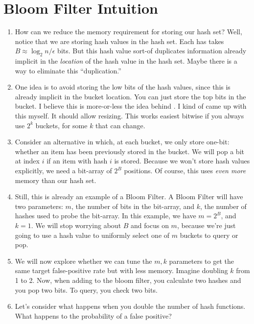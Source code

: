 \documentclass[11pt, oneside]{amsart}
\begin{document}
\section{Bloom Filter Intuition}

\begin{enumerate}

\item How can we reduce the memory requirement for storing our hash set?
Well, notice that we are storing hash values in the hash set. Each has
takes $B \approx \log_2 n / \epsilon$ bits. But this hash value sort-of
duplicates information already implicit in the \emph{location} of the
hash value in the hash set. Maybe there is a way to eliminate this
``duplication.''

\item One idea is to avoid storing the low bits of the hash values,
since this is already implicit in the bucket location. You can just
store the top bits in the bucket. I believe this is more-or-less the
idea behind . I kind of came up with this
myself. It should allow resizing. This works easiest bitwise if you
always use $2^k$ buckets, for some $k$ that can change.

\item Consider an alternative in which, at each bucket, we only store
one-bit: whether an item has been previously stored in the bucket. We
will pop a bit at index $i$ if an item with hash $i$ is stored. Because
we won't store hash values explicitly, we need a bit-array of $2^B$
positions. Of course, this uses \emph{even more} memory than our hash
set.

\item Still, this is already an example of a Bloom Filter. A Bloom
Filter will have two parameters: $m$, the number of bits in the
bit-array, and $k$, the number of hashes used to probe the bit-array. In
this example, we have $m = 2^B$, and $k=1$. We will stop worrying about
$B$ and focus on $m$, because we're just going to use a hash value to
uniformly select one of $m$ buckets to query or pop.

\item We will now explore whether we can tune the $m, k$ parameters to
get the same target false-positive rate but with less memory. Imagine
doubling $k$ from 1 to 2. Now, when adding to the bloom filter, you
calculate two hashes and you pop two bits. To query, you check two bits.

\item Let's consider what happens when you double the number of hash
functions. What happens to the probability of a false positive?


\end{enumerate}
\end{document}
